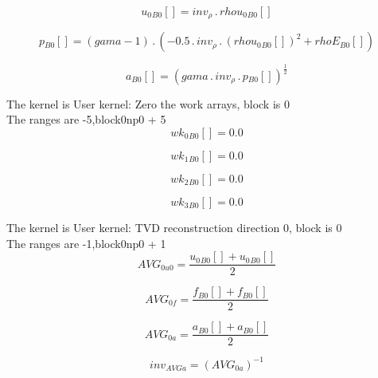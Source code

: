 \documentclass{article}
\begin{document}
\begin{dmath}{u_{0}{_{B0}}}[{}] = inv_{\rho} \,.\, {rhou_{0}{_{B0}}}[{}]\end{dmath}

\begin{dmath}{p{_{B0}}}[{}] = \left(gama - 1\right) \,.\, \left(- 0.5 \,.\, inv_{\rho} \,.\, \left({rhou_{0}{_{B0}}}[{}] \right)^{2} + {rhoE{_{B0}}}[{}]\right)\end{dmath}

\begin{dmath}{a{_{B0}}}[{}] = \left(gama \,.\, inv_{\rho} \,.\, {p{_{B0}}}[{}] \right)^{\frac{1}{2}}\end{dmath}

\noindent The kernel is User kernel: Zero the work arrays, block is 0\\\noindent The ranges are -5,block0np0 + 5\\\begin{dmath}{wk_{0}{_{B0}}}[{}] = 0.0\end{dmath}

\begin{dmath}{wk_{1}{_{B0}}}[{}] = 0.0\end{dmath}

\begin{dmath}{wk_{2}{_{B0}}}[{}] = 0.0\end{dmath}

\begin{dmath}{wk_{3}{_{B0}}}[{}] = 0.0\end{dmath}

\noindent The kernel is User kernel: TVD reconstruction direction 0, block is 0\\\noindent The ranges are -1,block0np0 + 1\\\begin{dmath}AVG_{0 u0} = \frac{{u_{0}{_{B0}}}[{}] + {u_{0}{_{B0}}}[{}]}{2}\end{dmath}

\begin{dmath}AVG_{0 f} = \frac{{f{_{B0}}}[{}] + {f{_{B0}}}[{}]}{2}\end{dmath}

\begin{dmath}AVG_{0 a} = \frac{{a{_{B0}}}[{}] + {a{_{B0}}}[{}]}{2}\end{dmath}

\begin{dmath}inv_{AVG a} = \left(AVG_{0 a} \right)^{-1}\end{dmath}
\end{document}
